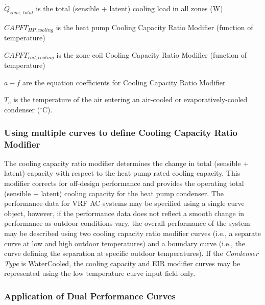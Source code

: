 \({\dot{Q}_{zone,\,total}}\) is the total (sensible + latent) cooling load in all zones (W)

\(CAPF{T_{HP,cooling}}\) is the heat pump Cooling Capacity Ratio Modifier (function of temperature)

\(CAPF{T_{coil,cooling}}\) is the zone coil Cooling Capacity Ratio Modifier (function of temperature)

\(a - f\) are the equation coefficients for Cooling Capacity Ratio Modifier

\({T_c}\) is the temperature of the air entering an air-cooled or evaporatively-cooled condenser (\(^{\circ}\)C).

\subsubsection{Using multiple curves to define Cooling Capacity Ratio Modifier}\label{using-multiple-curves-to-define-cooling-capacity-ratio-modifier}

The cooling capacity ratio modifier determines the change in total (sensible + latent) capacity with respect to the heat pump rated cooling capacity. This modifier corrects for off-design performance and provides the operating total (sensible + latent) cooling capacity for the heat pump condenser. The performance data for VRF AC systems may be specified using a single curve object, however, if the performance data does not reflect a smooth change in performance as outdoor conditions vary, the overall performance of the system may be described using two cooling capacity ratio modifier curves (i.e., a separate curve at low and high outdoor temperatures) and a boundary curve (i.e., the curve defining the separation at specific outdoor temperatures). If the \textit{Condenser Type} is WaterCooled, the cooling capacity and EIR modifier curves may be represented using the low temperature curve input field only.

\subsubsection{Application of Dual Performance Curves}\label{application-of-dual-performance-curves}

